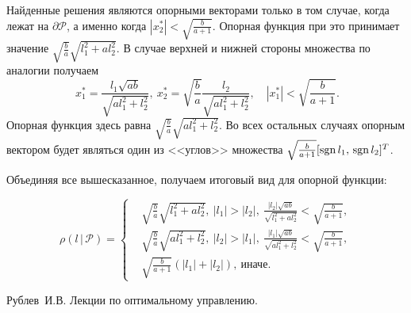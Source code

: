 \documentclass[11pt]{article}
\newcommand\PS{\mathcal{P}}
\newcommand\Sup[2]{\rho( #1 \, | \, #2 )}
\newcommand\Sgn{{\rm sgn \,}}
\begin{document}
Найденные решения являются опорными векторами только в том случае, когда лежат на $\partial \PS$, 
а именно когда $|x_2^*| < \sqrt{\frac{b}{a+1}}$. Опорная функция при это принимает значение 
$\sqrt{\frac{b}{a}}\sqrt{l_1^2+al_2^2}$. В случае верхней и нижней стороны множества по аналогии получаем
$$\ x_1^* = \frac{l_1\sqrt{ab}}{\sqrt{al_1^2+l_2^2}},\  x_2^* = \sqrt{\frac{b}{a}}\frac{l_2}{\sqrt{al_1^2+l_2^2}}, \quad |x_1^*| < \sqrt{\frac{b}{a+1}}.$$
Опорная функция здесь равна $\sqrt{\frac{b}{a}}\sqrt{al_1^2+l_2^2}$. Во всех остальных случаях опорным 
вектором будет являться один из <<углов>> множества $\sqrt{\frac{b}{a+1}}[\Sgn{l_1}, \, \Sgn{l_2}]^T$.

Объединяя все вышесказанное, получаем итоговый вид для опорной функции:

\begin{equation}
\Sup{l}{\PS} = 
\left\{
	\begin{aligned}
	& \sqrt{\frac{b}{a}}\sqrt{l_1^2+al_2^2}, \ |l_1| > |l_2|, \  \frac{|l_2|\sqrt{ab}}{\sqrt{l_1^2+al_2^2}} < \sqrt{\frac{b}{a+1}},\\
	& \sqrt{\frac{b}{a}}\sqrt{al_1^2+l_2^2}, \ |l_2| > |l_1|, \  \frac{|l_1|\sqrt{ab}}{\sqrt{al_1^2+l_2^2}} < \sqrt{\frac{b}{a+1}},\\
	& \sqrt{\frac{b}{a+1}}(|l_1| + |l_2|), \ \text{иначе}.
	\end{aligned}	
\right.
\end{equation}


\newpage
\begin{thebibliography}{0}
	Рублев~И.В. Лекции по оптимальному управлению.
\end{thebibliography}
\end{document}
